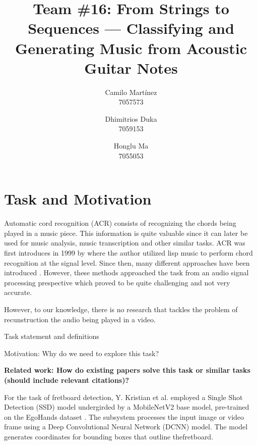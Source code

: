 \documentclass[10pt,twocolumn,letterpaper]{article}
\begin{document}
\title{Team \#16: From Strings to Sequences --- Classifying and Generating Music from Acoustic Guitar Notes}

\author{
Camilo Martínez\\
7057573\\
\and
Dhimitrios Duka\\
7059153\\
\and
Honglu Ma\\
7055053\\
}
\maketitle

\section{Task and Motivation}
Automatic cord recognition (ACR) consists of recognizing the chords being played in a music piece. This information is quite valuable since it can later be used for music analysis, music transcription and other similar tasks. ACR was first introduces in 1999 by \cite{takuya1999realtime} where the author utilized lisp music to perform chord recognition at the signal level. Since then, many different approaches have been introduced \cite{}. However, these methods approached the task from an audio signal processing prespective which proved to be quite challenging and not very accurate. 



However, to our knowledge, there is no research that tackles the problem of recunstruction the audio being played in a video. 

Task statement and definitions

Motivation: Why do we need to explore this task?

\textbf{Related work: How do existing papers solve this task or similar tasks (should include relevant citations)?}

For the task of fretboard detection, Y. Kristian et al. \cite[2024]{Kristian_Zaman_Tenoyo_Jodhinata_2024} employed a Single Shot Detection (SSD) model undergirded by a MobileNetV2 base model, pre-trained on the EgoHands dataset \cite{Bambach_2015_ICCV}. The subsystem processes the input image or video frame using a Deep Convolutional Neural Network (DCNN) model. The model generates coordinates for bounding boxes that outline thefretboard.
\end{document}
